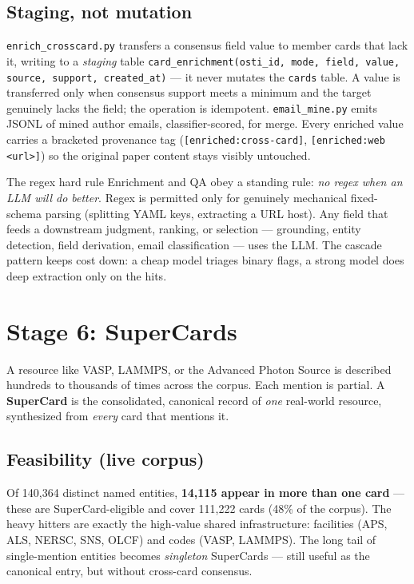\documentclass[11pt,letterpaper]{article}
\newcommand{\code}[1]{\texttt{\small #1}}
\begin{document}
\subsection{Staging, not mutation}

\code{enrich\_crosscard.py} transfers a consensus field value to member cards that
lack it, writing to a \emph{staging} table \code{card\_enrichment(osti\_id, mode,
field, value, source, support, created\_at)} --- it never mutates the \code{cards}
table. A value is transferred only when consensus support meets a minimum and the
target genuinely lacks the field; the operation is idempotent. \code{email\_mine.py}
emits JSONL of mined author emails, classifier-scored, for merge. Every enriched
value carries a bracketed provenance tag (\code{[enriched:cross-card]},
\code{[enriched:web <url>]}) so the original paper content stays visibly untouched.

\begin{notebox}{The regex hard rule}
Enrichment and QA obey a standing rule: \emph{no regex when an LLM will do better}.
Regex is permitted only for genuinely mechanical fixed-schema parsing (splitting
YAML keys, extracting a URL host). Any field that feeds a downstream judgment,
ranking, or selection --- grounding, entity detection, field derivation, email
classification --- uses the LLM. The cascade pattern keeps cost down: a cheap model
triages binary flags, a strong model does deep extraction only on the hits.
\end{notebox}

\clearpage
\section{Stage 6: SuperCards}
\label{sec:supercards}

A resource like VASP, LAMMPS, or the Advanced Photon Source is described hundreds to
thousands of times across the corpus. Each mention is partial. A \textbf{SuperCard}
is the consolidated, canonical record of \emph{one} real-world resource, synthesized
from \emph{every} card that mentions it.

\subsection{Feasibility (live corpus)}

Of 140{,}364 distinct named entities, \textbf{14{,}115 appear in more than one card}
--- these are SuperCard-eligible and cover 111{,}222 cards (48\% of the corpus). The
heavy hitters are exactly the high-value shared infrastructure: facilities (APS,
ALS, NERSC, SNS, OLCF) and codes (VASP, LAMMPS). The long tail of single-mention
entities becomes \emph{singleton} SuperCards --- still useful as the canonical entry,
but without cross-card consensus.
\end{document}
